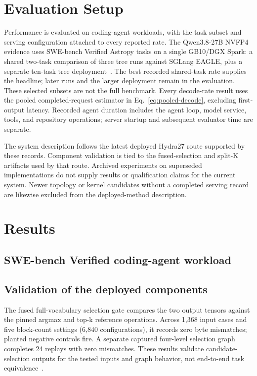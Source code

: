\documentclass[conference]{IEEEtran}
\begin{document}
\section{Evaluation Setup}
\label{sec:protocol}
Performance is evaluated on coding-agent workloads, with the task subset and serving configuration attached to every reported rate. The Qwen3.8-27B NVFP4 evidence uses SWE-bench Verified Astropy tasks on a single GB10/DGX Spark: a shared two-task comparison of three tree runs against SGLang EAGLE, plus a separate ten-task tree deployment~\cite{lumo2026archive,jimenez2024swe}. The best recorded shared-task rate supplies the headline; later runs and the larger deployment remain in the evaluation. These selected subsets are not the full benchmark. Every decode-rate result uses the pooled completed-request estimator in Eq.~\ref{eq:pooled-decode}, excluding first-output latency. Recorded agent duration includes the agent loop, model service, tools, and repository operations; server startup and subsequent evaluator time are separate.

The system description follows the latest deployed Hydra27 route supported by these records. Component validation is tied to the fused-selection and split-K artifacts used by that route. Archived experiments on superseded implementations do not supply results or qualification claims for the current system. Newer topology or kernel candidates without a completed serving record are likewise excluded from the deployed-method description.

\section{Results}
\label{sec:results}
\subsection{SWE-bench Verified coding-agent workload}
\label{sec:agent-workload}


\subsection{Validation of the deployed components}
\label{sec:current-validation}
The fused full-vocabulary selection gate compares the two output tensors against the pinned argmax and top-k reference operations. Across 1,368 input cases and five block-count settings (6,840 configurations), it records zero byte mismatches; planted negative controls fire. A separate captured four-level selection graph completes 24 replays with zero mismatches. These results validate candidate-selection outputs for the tested inputs and graph behavior, not end-to-end task equivalence~\cite{lumo2026archive}.
\end{document}
